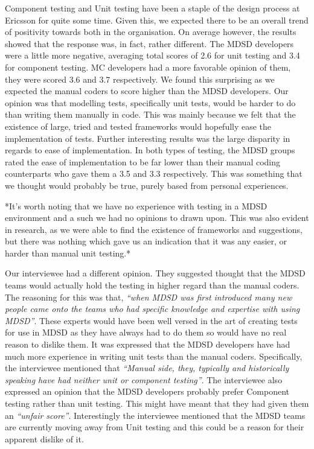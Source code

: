 \documentclass[final_report_innit.tex]{subfiles}
\begin{document}
Component testing and Unit testing have been a staple of the design process at Ericsson for quite some time. Given this, we expected there to be an overall trend of positivity towards both in the organisation. On average however, the results showed that the response was, in fact, rather different. The MDSD developers were a little more negative, averaging total scores of 2.6 for unit testing and 3.4 for component testing. MC developers had a more favorable opinion of them, they were scored 3.6 and 3.7 respectively. We found this surprising as we expected the manual coders to score higher than the MDSD developers. Our opinion was that modelling tests, specifically unit tests, would be harder to do than writing them manually in code. This was mainly because we felt that the existence of large, tried and tested frameworks would hopefully ease the implementation of tests. Further interesting results was the large disparity in regards to ease of implementation. In both types of testing, the MDSD groups rated the ease of implementation to be far lower than their manual coding counterparts who gave them a 3.5 and 3.3 respectively. This was something that we thought would probably be true, purely based from personal experiences.

*It's worth noting that we have no experience with testing in a MDSD environment and a such we had no opinions to drawn upon. This was also evident in research, as we were able to find the existence of frameworks and suggestions, but there was nothing which gave us an indication that it was any easier, or harder than manual unit testing.*

Our interviewee had a different opinion. They suggested thought that the MDSD teams would actually hold the testing in higher regard than the manual coders. The reasoning for this was that, \textit{``when MDSD was first introduced many new people came onto the teams who had specific knowledge and expertise with using MDSD''}. These experts would have been well versed in the art of creating tests for use in MDSD as they have always had to do them so would have no real reason to dislike them. It was expressed that the MDSD developers have had much more experience in writing unit tests than the manual coders. Specifically, the interviewee mentioned that \textit{``Manual side, they, typically and historically speaking have had neither unit or component testing''}. The interviewee also expressed an opinion that the MDSD developers probably prefer Component testing rather than unit testing. This might have meant that they had given them an \textit{``unfair score''}. Interestingly the interviewee mentioned that the MDSD teams are currently moving away from Unit testing and this could be a reason for their apparent dislike of it.
\end{document}
